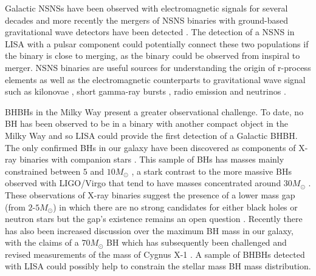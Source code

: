 Galactic NSNSs have been observed with electromagnetic signals for several decades \citep[e.g.][]{Hulse+1975, Tauris+2017,Vigna-Gomez+2018} and more recently the mergers of NSNS binaries with ground-based gravitational wave detectors have been detected \citep[e.g.][]{Abbott+2017_NSNS}. The detection of a NSNS in LISA with a pulsar component could potentially connect these two populations if the binary is close to merging, as the binary could be observed from inspiral to merger. NSNS binaries are useful sources for understanding the origin of r-process elements \citep[e.g.][]{Eichler+1989} as well as the electromagnetic counterparts to gravitational wave signal such as kilonovae \citep[e.g.][]{Metzger+2017}, short gamma-ray bursts \citep[e.g.][]{Gompertz+2020}, radio emission \citep[e.g.][]{Hotokezaka+2016} and neutrinos \citep[e.g.][]{Kyutoku+2018}.

BHBHs in the Milky Way present a greater observational challenge. To date, no BH has been observed to be in a binary with another compact object in the Milky Way and so LISA could provide the first detection of a Galactic BHBH. The only confirmed BHs in our galaxy have been discovered as components of X-ray binaries with companion stars \citep[e.g.][]{Bolton+1972,Webster+1972}. This sample of BHs has masses mainly constrained between $5$ and $10 \unit{M_\odot}$ \citep{Corral-Santana+2016}, a stark contrast to the more massive BHs observed with LIGO/Virgo that tend to have masses concentrated around $30 \unit{M_{\odot}}$ \citep{Abbott+2020_GWTC2}. These observations of X-ray binaries suggest the presence of a lower mass gap (from $2$-$5 \unit{M_{\odot}}$) in which there are no strong candidates for either black holes or neutron stars \citep{Ozel+2010,Farr+2011} but the gap's existence remains an open question \citep[e.g.][]{Kreidberg+2012, Mandel+2020}. Recently there has also been increased discussion over the maximum BH mass in our galaxy, with the claims of a $70 \unit{M_{\odot}}$ BH \citep{Liu+2019} which has subsequently been challenged \citep{El-Badry+2020, Abdul-Masih+2020, Shenar+2020,Eldridge+2020} and revised measurements of the mass of Cygnus X-1 \citep{Miller-Jones+2021}. A sample of BHBHs detected with LISA could possibly help to constrain the stellar mass BH mass distribution.

